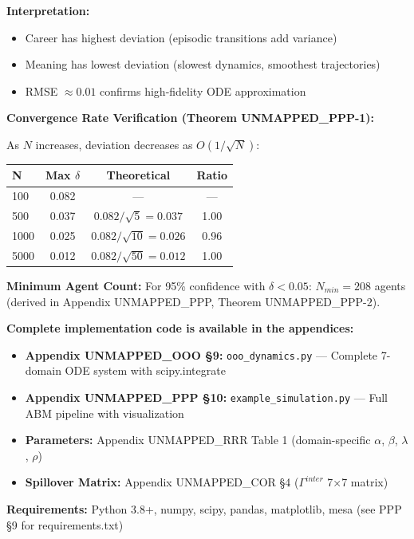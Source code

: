 \textbf{Interpretation:}
\begin{itemize}[nosep]
\item Career has highest deviation (episodic transitions add variance)
\item Meaning has lowest deviation (slowest dynamics, smoothest trajectories)
\item RMSE $\approx 0.01$ confirms high-fidelity ODE approximation
\end{itemize}

\textbf{Convergence Rate Verification (Theorem UNMAPPED_PPP-1):}

As $N$ increases, deviation decreases as $O(1/\sqrt{N})$:

\begin{center}
\small
\begin{tabular}{@{}lccc@{}}
\toprule
\textbf{N} & \textbf{Max $\delta$} & \textbf{Theoretical} & \textbf{Ratio} \\
\midrule
100 & 0.082 & --- & --- \\
500 & 0.037 & $0.082/\sqrt{5} = 0.037$ & 1.00 \\
1000 & 0.025 & $0.082/\sqrt{10} = 0.026$ & 0.96 \\
5000 & 0.012 & $0.082/\sqrt{50} = 0.012$ & 1.00 \\
\bottomrule
\end{tabular}
\end{center}

\textbf{Minimum Agent Count:} For 95\% confidence with $\delta < 0.05$: $N_{min} = 208$ agents (derived in Appendix UNMAPPED_PPP, Theorem UNMAPPED_PPP-2).

\begin{tcolorbox}[colback=gray!5!white, colframe=gray!75!black, title=Computational Resources]
\textbf{Complete implementation code is available in the appendices:}

\begin{itemize}[nosep]
\item \textbf{Appendix UNMAPPED_OOO §9:} \texttt{ooo\_dynamics.py} --- Complete 7-domain ODE system with scipy.integrate
\item \textbf{Appendix UNMAPPED_PPP §10:} \texttt{example\_simulation.py} --- Full ABM pipeline with visualization
\item \textbf{Parameters:} Appendix UNMAPPED_RRR Table 1 (domain-specific $\alpha$, $\beta$, $\lambda$, $\rho$)
\item \textbf{Spillover Matrix:} Appendix UNMAPPED_COR §4 ($\Gamma^{inter}$ 7×7 matrix)
\end{itemize}

\textbf{Requirements:} Python 3.8+, numpy, scipy, pandas, matplotlib, mesa (see PPP §9 for requirements.txt)
\end{tcolorbox}

